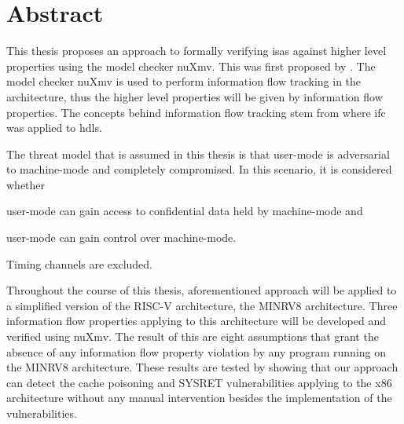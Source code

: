 \chapter*{\centering Abstract}

This thesis proposes an approach to formally verifying \glspl{isa} against higher level properties using the model checker nuXmv.
This was first proposed by \cite{Reid17}.
The model checker nuXmv is used to perform information flow tracking in the architecture, thus the higher level properties will be given by information flow properties.
The concepts behind information flow tracking stem from \cite{Ferraiuolo17} where \gls{ifc} was applied to \glspl{hdl}.

The threat model that is assumed in this thesis is that user-mode is adversarial to machine-mode and completely compromised.
In this scenario, it is considered whether
\begin{enumerate*}[label=\alph*)]
    \item user-mode can gain access to confidential data held by machine-mode and
    \item user-mode can gain control over machine-mode.
\end{enumerate*}
Timing channels are excluded.

Throughout the course of this thesis, aforementioned approach will be applied to a simplified version of the RISC-V architecture, the MINRV8 architecture.
Three information flow properties applying to this architecture will be developed and verified using nuXmv.
The result of this are eight assumptions that grant the absence of any information flow property violation by any program running on the MINRV8 architecture.
These results are tested by showing that our approach can detect the cache poisoning \cite{Wojtczuk09} and SYSRET vulnerabilities \cite{SYSRET-vuln,Dunlap19} applying to the x86 architecture without any manual intervention besides the implementation of the vulnerabilities.

